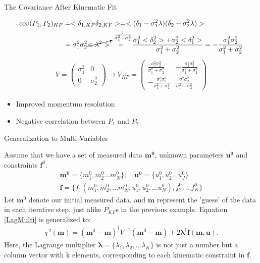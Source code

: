 \documentclass[
	xcolor=dvipsnames,
	aspectratio=169,	
	10pt, 
	]{beamer}
\begin{document}
\begin{frame}{The Covariance After Kinematic Fit}
	\begin{block}{}
		\begin{align}
			cov(P_{1},P_{2})_{KF}& = <\delta_{1,KF}\delta_{2,KF}> = <(\delta_1 -\sigma_1^2\lambda)(\delta_2-\sigma_2^2\lambda)> \nonumber\\
			&= \sigma_1^2\sigma_2^2\cancelto{\frac{1}{\sigma_1^2+\sigma_2^2}}{<\lambda^2>}\quad -\quad \frac{\sigma_1^2<\delta_2^2>+\sigma_2^2<\delta_1^2>}{\sigma_1^2+\sigma_2^2} =-\frac{\sigma_1^2\sigma_2^2}{\sigma_1^2+\sigma_2^2}
		\end{align}
		\begin{align}
			V=\begin{pmatrix}
				\sigma_1^2&0\\
				0&\sigma_2^2
			\end{pmatrix}\to V_{KF} =
			\begin{pmatrix}
\frac{\sigma_1^2\sigma_2^2}{\sigma_1^2+\sigma_2^2}&-\frac{\sigma_1^2\sigma_2^2}{\sigma_1^2+\sigma_2^2}\\
-\frac{\sigma_1^2\sigma_2^2}{\sigma_1^2+\sigma_2^2}&\frac{\sigma_1^2\sigma_2^2}{\sigma_1^2+\sigma_2^2}
			\end{pmatrix}
		\end{align}
		\begin{itemize}
			\item Improved momentum resolution
			\item Negative correlation between $P_1$ and $P_2$
		\end{itemize}
	\end{block}
\end{frame}
\begin{frame}{Generalization to Multi-Variables}
	\begin{block}{}
		Assume that we have a set of measured data $\mathbf{m^0}$, unknown parameters $\mathbf {u^0}$ and constraints $\mathbf f^0$.
		\begin{align}
			\mathbf {m^0} =\{m_1^0,m_2^0\ldots m_N^0\};\quad \mathbf {u^0} =\{u_1^0,u_2^0\ldots u_J^0\}\nonumber\\
			\mathbf f =\{f_1(m_1^0,m_2^0,\ldots m_N^0,u_1^0,u_2^0,\ldots u_N^0),f_2^0,\ldots f_K^0\}
		\end{align}
		 Let $\mathbf m^0$ denote our initial measured data, and $\mathbf m$ represent the 'guess' of the data in each iterative step, just alike $P_{KF}$s in the previous example. Equation \eqref{LagMulti} is generalized to:
		\begin{align}
			\chi^2(\mathbf{m}) = (\mathbf{m}^0-\mathbf{m})^\dagger V^{-1}(\mathbf{m}^0-\mathbf{m})+2\mathbf\lambda^\dagger \mathbf {f}(\mathbf{m,u}).\label{KFChi2}
		\end{align}
		Here, the Lagrange multiplier $\mathbf \lambda =\{\lambda_1,\lambda_2,\ldots\lambda_K\}$ is not just a number but a column vector with k elements, corresponding to each kinematic constraint in $\mathbf f$. 
	\end{block}
\end{frame}
\end{document}
